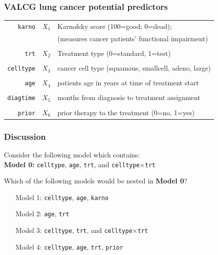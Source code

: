 \begin{frame}
\frametitle{VALCG lung cancer potential predictors}
\begin{tabular}{r|c|l}
\texttt{karno} & $X_1$ & Karnofsky score (100=good; 0=dead); \\
               & &(measures cancer patients' functional impairment) \\
& \\
\texttt{trt} & $X_2$ & Treatment type (0=standard, 1=test) \\
& \\
\texttt{celltype} & $X_3$& cancer cell type (squamous, smallcell, adeno, large) \\
& \\
\texttt{age} & $X_4$ & patients age in years at time of treatment start \\
& \\
\texttt{diagtime} & $X_5$ & months from diagnosis to treatment assignment \\
& \\
\texttt{prior} & $X_6$ & prior therapy to the treatment (0=no, 1=yes) \\
\end{tabular}
\end{frame}

\begin{frame}
\frametitle{Discussion}
Consider the following model which contains:\\
\vskip10pt
\textbf{Model 0:} \texttt{celltype}, \texttt{age}, \texttt{trt}, and \texttt{celltype}$\times$\texttt{trt}
\vskip20pt
\begin{clicker}{Which of the following models would be nested in \textbf{Model 0}?}
\begin{enumerate}
\item[Model 1:] \texttt{celltype}, \texttt{age}, \texttt{karno}
\item[Model 2:] \texttt{age}, \texttt{trt}
\item[Model 3:] \texttt{celltype}, \texttt{trt}, and \texttt{celltype}$\times$\texttt{trt}
\item[Model 4:] \texttt{celltype}, \texttt{age}, \texttt{trt}, \texttt{prior}
\end{enumerate}
\end{clicker}
\end{frame}


